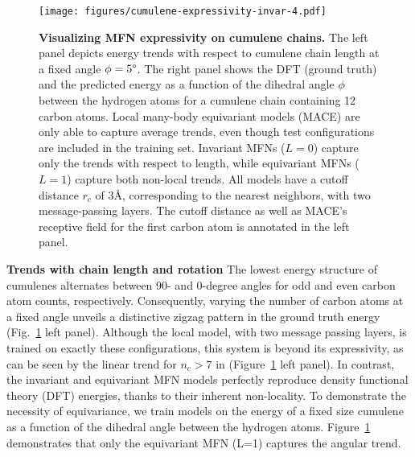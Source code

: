 \documentclass{article} \usepackage{iclr2024_conference,times}
\begin{document}
\begin{figure}[h!]
    \centering
    \vspace{-7pt}
    \texttt{[image: figures/cumulene-expressivity-invar-4.pdf]}
	\caption{\textbf{Visualizing MFN expressivity on cumulene chains.} The left panel depicts energy trends with respect to cumulene chain length at a fixed angle $\phi=5\degree$. The right panel shows the DFT (ground truth) and the predicted energy as a function of the dihedral angle $\phi$ between the hydrogen atoms for a cumulene chain containing 12 carbon atoms. Local many-body equivariant models (MACE) are only able to capture average trends, even though test configurations are included in the training set. Invariant MFNs ($L=0$) capture only the trends with respect to length, while equivariant MFNs ($L=1$) capture both non-local trends. All models have a cutoff distance $r_c$ of 3\AA{}, corresponding to the nearest neighbors, with two message-passing layers. The cutoff distance as well as MACE's receptive field for the first carbon atom is annotated in the left panel.}
    \label{fig:cumulenes-combined}
\end{figure}
\textbf{Trends with chain length and rotation}
The lowest energy structure of cumulenes alternates between 90- and 0-degree angles for odd and even carbon atom counts, respectively. Consequently, varying the number of carbon atoms at a fixed angle unveils a distinctive zigzag pattern in the ground truth energy (Fig.~\ref{fig:cumulenes-combined} left panel). Although the local model, with two message passing layers, is trained on exactly these configurations, this system is beyond its expressivity, as can be seen by the linear trend for $n_c>7$ in (Figure~\ref{fig:cumulenes-combined} left panel). In contrast, the invariant and equivariant MFN models perfectly reproduce density functional theory (DFT) energies, thanks to their inherent non-locality. 
To demonstrate the necessity of equivariance, we train models on the energy of a fixed size cumulene as a function of the dihedral angle between the hydrogen atoms. Figure~\ref{fig:cumulenes-combined} demonstrates that only the equivariant MFN (L=1) captures the angular trend. 
\end{document}
